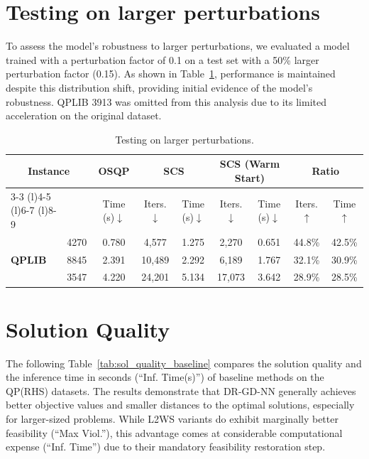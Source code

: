 \documentclass[10pt]{article} %
\begin{document}
\clearpage
\newpage

\section{Testing on larger perturbations}
To assess the model's robustness to larger perturbations, we evaluated a model trained with a perturbation factor of 0.1 on a test set with a 50\% larger perturbation factor (0.15). As shown in Table~\ref{tab:larger_perturb}, performance is maintained despite this distribution shift, providing initial evidence of the model's robustness. QPLIB 3913 was omitted from this analysis due to its limited acceleration on the original dataset.

\begin{table}[h]
\centering
\caption{Testing on larger perturbations.}
\label{tab:larger_perturb}
	\begin{tabular}{@{}ll c cc cc cc}
	\toprule
       \multicolumn{2}{c}{\multirow{2}{*}{\bf Instance}} & \multicolumn{1}{c}{\bf OSQP} & \multicolumn{2}{c}{\bf SCS} &\multicolumn{2}{c}{\bf SCS (Warm Start)} &\multicolumn{2}{c}{\bf Ratio}  \\
        \cmidrule(l){3-3} \cmidrule(l){4-5} \cmidrule(l){6-7} \cmidrule(l){8-9}
		&& Time (s)$\downarrow$ & Iters.$\downarrow$ & Time (s)$\downarrow$ & Iters.$\downarrow$ & Time (s)$\downarrow$ & Iters. $\uparrow$& Time $\uparrow$ \\ 
        \midrule
        \multirow{3}{*}{\textbf{QPLIB}}
        &4270 &  0.780 & 4,577   & 1.275 & 2,270  & 0.651 & 44.8\% & 42.5\%  \\
        &8845 &  2.391 & 10,489   & 2.292 & 6,189  & 1.767 & 32.1\% & 30.9\%  \\
        &3547 &  4.220 & 24,201   & 5.134 & 17,073  & 3.642 & 28.9\% & 28.5\%  \\
	\bottomrule
	\end{tabular}
\end{table}


\section{Solution Quality}

The following Table~\ref{tab:sol_quality_baseline} compares the solution quality and the inference time in seconds (\enquote{Inf. Time(s)}) of baseline methods on the QP(RHS) datasets. The results demonstrate that DR-GD-NN generally achieves better objective values and smaller distances to the optimal solutions, especially for larger-sized problems.
While L2WS variants do exhibit marginally better feasibility (\enquote{Max Viol.}), this advantage comes at considerable computational expense (\enquote{Inf. Time}) due to their mandatory feasibility restoration step.
\end{document}
